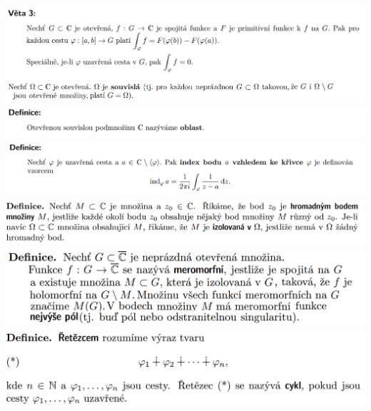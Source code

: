 \documentclass[12pt,a4paper]{article}
\begin{document}
\begin{center}
		\includegraphics[width=\textwidth]{img/5komp/2020-06-21 09 54 29.png}\vspace{0.3cm}
		\includegraphics[width=\textwidth]{img/5komp/2020-06-21 09 55 03.png}\vspace{0.3cm}
		\includegraphics[width=\textwidth]{img/5komp/2020-06-21 09 55 15.png}\vspace{0.3cm}
		\includegraphics[width=\textwidth]{img/5komp/2020-06-21 09 56 10.png}\vspace{0.3cm}
		\includegraphics[width=\textwidth]{img/5komp/2020-06-21 10 11 43.png}\vspace{0.3cm}
		\includegraphics[width=\textwidth]{img/5komp/2020-06-21 10 06 40.png}\vspace{0.3cm}
		\includegraphics[width=\textwidth]{img/5komp/2020-06-21 10 08 30.png}\vspace{0.3cm}

\end{center}
\end{document}
